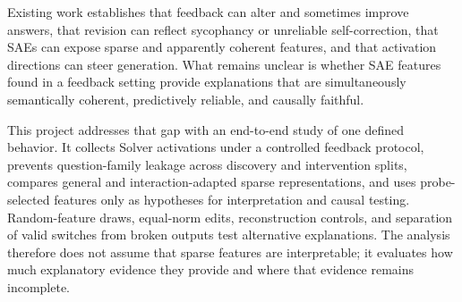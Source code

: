 Existing work establishes that feedback can alter and sometimes improve answers, that revision can reflect sycophancy or unreliable self-correction, that SAEs can expose sparse and apparently coherent features, and that activation directions can steer generation. What remains unclear is whether SAE features found in a feedback setting provide explanations that are simultaneously semantically coherent, predictively reliable, and causally faithful.

This project addresses that gap with an end-to-end study of one defined behavior. It collects Solver activations under a controlled feedback protocol, prevents question-family leakage across discovery and intervention splits, compares general and interaction-adapted sparse representations, and uses probe-selected features only as hypotheses for interpretation and causal testing. Random-feature draws, equal-norm edits, reconstruction controls, and separation of valid switches from broken outputs test alternative explanations. The analysis therefore does not assume that sparse features are interpretable; it evaluates how much explanatory evidence they provide and where that evidence remains incomplete.
